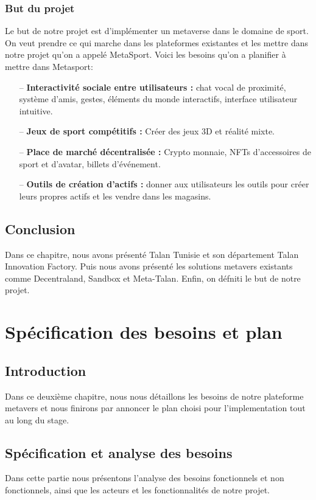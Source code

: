 \documentclass[12pt,a4paper,oneside,french]{book}
\begin{document}
\subsection{But du projet}
Le but de notre projet est d'implémenter un metaverse dans le domaine de sport. On veut prendre ce qui marche dans les plateformes existantes et les mettre dans notre projet qu'on a appelé MetaSport. Voici les besoins qu'on a planifier à mettre dans Metasport:
\begin{itemize}
\item[--] \textbf{Interactivité sociale entre utilisateurs :} chat vocal de proximité, système d’amis, gestes, éléments du monde interactifs, interface utilisateur intuitive.
\item[--] \textbf{Jeux de sport compétitifs :} Créer des jeux 3D et réalité mixte.
\item[--] \textbf{Place de marché décentralisée :} Crypto monnaie, NFTs d’accessoires de sport et d’avatar, billets d’événement.
\item[--] \textbf{Outils de création d’actifs :} donner aux utilisateurs les outils pour créer leurs propres actifs et les vendre dans les magasins.
\end{itemize}

\section*{Conclusion}
Dans ce chapitre, nous avons présenté Talan Tunisie et son département Talan Innovation Factory. Puis nous avons présenté les solutions metavers existants comme Decentraland, Sandbox et Meta-Talan. Enfin, on défniti le but de notre projet.


\chapter{Spécification des besoins et plan}
\label{ch:2eme}

\section*{Introduction}
Dans ce deuxième chapitre, nous nous détaillons les besoins de notre plateforme metavers et nous finirons par annoncer le plan choisi pour l'implementation tout au long du stage.

\section{Spécification et analyse des besoins}
Dans cette partie nous présentons l’analyse des besoins fonctionnels et non fonctionnels, ainsi
que les acteurs et les fonctionnalités de notre projet.
\end{document}
